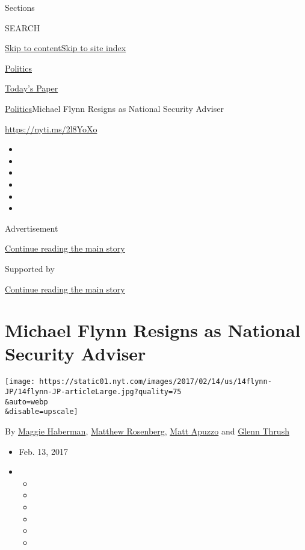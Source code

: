 Sections

SEARCH

\protect\hyperlink{site-content}{Skip to
content}\protect\hyperlink{site-index}{Skip to site index}

\href{https://www.nytimes.com/section/politics}{Politics}

\href{https://myaccount.nytimes.com/auth/login?response_type=cookie\&client_id=vi}{}

\href{https://www.nytimes.com/section/todayspaper}{Today's Paper}

\href{/section/politics}{Politics}\textbar{}Michael Flynn Resigns as
National Security Adviser

\url{https://nyti.ms/2l8YoXo}

\begin{itemize}
\item
\item
\item
\item
\item
\item
\end{itemize}

Advertisement

\protect\hyperlink{after-top}{Continue reading the main story}

Supported by

\protect\hyperlink{after-sponsor}{Continue reading the main story}

\hypertarget{michael-flynn-resigns-as-national-security-adviser}{%
\section{Michael Flynn Resigns as National Security
Adviser}\label{michael-flynn-resigns-as-national-security-adviser}}

\texttt{[image: https://static01.nyt.com/images/2017/02/14/us/14flynn-JP/14flynn-JP-articleLarge.jpg?quality=75\\\&auto=webp\\\&disable=upscale]}

By \href{https://www.nytimes.com/by/maggie-haberman}{Maggie Haberman},
\href{https://www.nytimes.com/by/matthew-rosenberg}{Matthew Rosenberg},
\href{https://www.nytimes.com/by/matt-apuzzo}{Matt Apuzzo} and
\href{https://www.nytimes.com/by/glenn-thrush}{Glenn Thrush}

\begin{itemize}
\item
  Feb. 13, 2017
\item
  \begin{itemize}
  \item
  \item
  \item
  \item
  \item
  \item
  \end{itemize}
\end{itemize}

